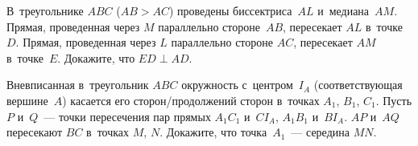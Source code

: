 \begin{problems}
\item
В~треугольнике $ABC$ ($AB > AC$) проведены биссектриса~$AL$ и~медиана~$AM$.
Прямая, проведенная через $M$ параллельно стороне~$AB$, пересекает $AL$
в~точке~$D$.
Прямая, проведенная через $L$ параллельно стороне $AC$, пересекает $AM$
в~точке~$E$.
Докажите, что $ED \perp AD$.

\item
Вневписанная в~треугольник $ABC$ окружность с~центром~$I_{A}$
(соответствующая вершине~$A$) касается его сторон/продолжений сторон
в~точках $A_{1}$, $B_{1}$, $C_{1}$.
Пусть $P$ и~$Q$~--- точки пересечения пар прямых
$A_{1}C_{1}$ и~$CI_{A}$, $A_{1}B_{1}$ и~$BI_{A}$.
$AP$ и~$AQ$ пересекают $BC$ в~точках $M$, $N$.
Докажите, что точка~$A_{1}$~--- середина $MN$.

\end{problems}

